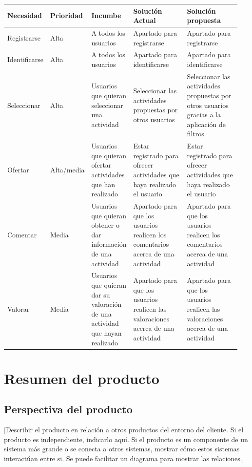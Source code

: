 \documentclass[11pt]{article}
\begin{document}
\begin{table}[H]
  \centering
  \begin{tabular}{p{0.15\linewidth}p{0.15\linewidth}p{0.15\linewidth}p{0.25\linewidth}p{0.25\linewidth}}
    \toprule
    \textbf{Necesidad} & \textbf{Prioridad} & \textbf{Incumbe} & \textbf{Solución Actual} & \textbf{Solución propuesta} \\
    \midrule
    Registrarse & Alta & A todos los usuarios & Apartado para registrarse & Apartado para registrarse\\
    Identificarse & Alta & A todos los usuarios & Apartado para identificarse & Apartado para identificarse\\
    Seleccionar & Alta & Usuarios que quieran seleccionar una actividad & Seleccionar las actividades propuestas por otros usuarios & Seleccionar las actividades propuestas por otros usuarios gracias a la aplicación de filtros\\
    Ofertar & Alta/media & Usuarios que quieran ofertar actividades que han realizado & Estar registrado para ofrecer actividades que haya realizado el usuario & Estar registrado para ofrecer actividades que haya realizado el usuario\\
    Comentar & Media & Usuarios que quieran obtener o dar información de una actividad & Apartado para que los usuarios realicen los comentarios acerca de una actividad & Apartado para que los usuarios realicen los comentarios acerca de una actividad\\
    Valorar & Media & Usuarios que quieran dar su valoración de una actividad que hayan realizado & Apartado para que los usuarios realicen las valoraciones acerca de una actividad & Apartado para que los usuarios realicen las valoraciones acerca de una actividad \\
    
    \bottomrule
  \end{tabular}
\end{table}
\newpage

\section{Resumen del producto}\label{4}
\subsection{Perspectiva del producto}
[Describir el producto en relación a otros productos del entorno del cliente. Si el producto es independiente, indicarlo aquí. Si el producto es un componente de un sistema más grande o se conecta a otros sistemas, mostrar cómo estos sistemas interactúan entre si. Se puede facilitar un diagrama para mostrar las relaciones.]
\end{document}

